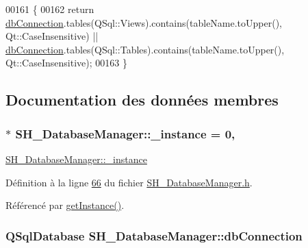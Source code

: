 \begin{DoxyCode}
00161 \{
00162     \textcolor{keywordflow}{return} \hyperlink{classSH__DatabaseManager_a9291f61c3abbba2c4f1567b1d8325f0e}{dbConnection}.tables(QSql::Views).contains(tableName.toUpper(), Qt::CaseInsensitive) 
      || \hyperlink{classSH__DatabaseManager_a9291f61c3abbba2c4f1567b1d8325f0e}{dbConnection}.tables(QSql::Tables).contains(tableName.toUpper(), Qt::CaseInsensitive);
00163 \}
\end{DoxyCode}


\subsection{Documentation des données membres}
\hypertarget{classSH__DatabaseManager_a8ca37d0cafa6a181582d60e045a8d5ab}{
\subsubsection[{\-\_\-instance}]{ $\ast$ S\-H\-\_\-\-Database\-Manager\-::\-\_\-instance = 0\hspace{0.3cm}{\ttfamily [static]}, {\ttfamily [private]}}}\label{classSH__DatabaseManager_a8ca37d0cafa6a181582d60e045a8d5ab}
\hyperlink{classSH__DatabaseManager_a8ca37d0cafa6a181582d60e045a8d5ab}{S\-H\-\_\-\-Database\-Manager\-::\-\_\-instance} 

Définition à la ligne \hyperlink{SH__DatabaseManager_8h_source_l00066}{66} du fichier \hyperlink{SH__DatabaseManager_8h_source}{S\-H\-\_\-\-Database\-Manager.\-h}.



Référencé par \hyperlink{classSH__DatabaseManager_a638369a15265ab0aa053080a32d2ca39}{get\-Instance()}.

\hypertarget{classSH__DatabaseManager_a9291f61c3abbba2c4f1567b1d8325f0e}{
\subsubsection[{db\-Connection}]{\setlength{\rightskip}{0pt plus 5cm}Q\-Sql\-Database S\-H\-\_\-\-Database\-Manager\-::db\-Connection\hspace{0.3cm}{\ttfamily [protected]}}}\label{classSH__DatabaseManager_a9291f61c3abbba2c4f1567b1d8325f0e}


